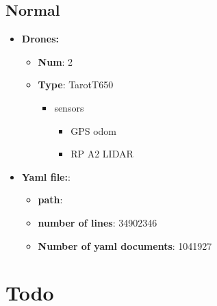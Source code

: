    \subsection{Normal}
        \begin{itemize}
            \item \textbf{Drones:}
                \begin{itemize}
                    \item \textbf{Num}: 2
                    \item \textbf{Type}: TarotT650
                        \begin{itemize}
                            \item sensors
                                \begin{itemize}
                                    \item GPS odom
                                    \item RP A2 LIDAR
                                \end{itemize}
                        \end{itemize}
                \end{itemize}
            \item \textbf{Yaml file:}:
                \begin{itemize}
                    \item \textbf{path}: 
                    \item \textbf{number of lines}: 34902346
                    \item \textbf{Number of yaml documents}: 1041927
                \end{itemize}
        \end{itemize}


\section{Todo}
